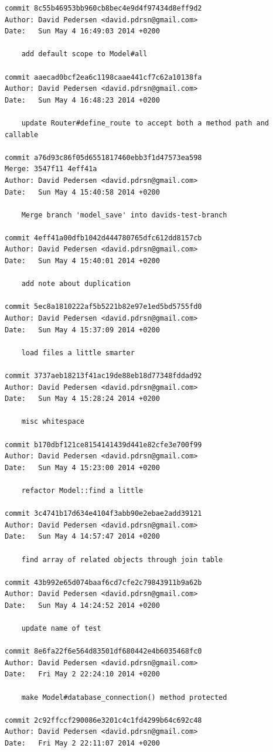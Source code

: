 \documentclass[12pt]{article}
\begin{document}
\begin{verbatim}
commit 8c55b46953bb960cb8bec4e9d4f97434d8eff9d2
Author: David Pedersen <david.pdrsn@gmail.com>
Date:   Sun May 4 16:49:03 2014 +0200

    add default scope to Model#all

commit aaecad0bcf2ea6c1198caae441cf7c62a10138fa
Author: David Pedersen <david.pdrsn@gmail.com>
Date:   Sun May 4 16:48:23 2014 +0200

    update Router#define_route to accept both a method path and callable

commit a76d93c86f05d6551817460ebb3f1d47573ea598
Merge: 3547f11 4eff41a
Author: David Pedersen <david.pdrsn@gmail.com>
Date:   Sun May 4 15:40:58 2014 +0200

    Merge branch 'model_save' into davids-test-branch

commit 4eff41a00dfb1042d444780765dfc612dd8157cb
Author: David Pedersen <david.pdrsn@gmail.com>
Date:   Sun May 4 15:40:01 2014 +0200

    add note about duplication

commit 5ec8a1810222af5b5221b82e97e1ed5bd5755fd0
Author: David Pedersen <david.pdrsn@gmail.com>
Date:   Sun May 4 15:37:09 2014 +0200

    load files a little smarter

commit 3737aeb18213f41ac19de88eb18d77348fddad92
Author: David Pedersen <david.pdrsn@gmail.com>
Date:   Sun May 4 15:28:24 2014 +0200

    misc whitespace

commit b170dbf121ce8154141439d441e82cfe3e700f99
Author: David Pedersen <david.pdrsn@gmail.com>
Date:   Sun May 4 15:23:00 2014 +0200

    refactor Model::find a little

commit 3c4741b17d634e4104f3abb90e2ebae2add39121
Author: David Pedersen <david.pdrsn@gmail.com>
Date:   Sun May 4 14:57:47 2014 +0200

    find array of related objects through join table

commit 43b992e65d074baaf6cd7cfe2c79843911b9a62b
Author: David Pedersen <david.pdrsn@gmail.com>
Date:   Sun May 4 14:24:52 2014 +0200

    update name of test

commit 8e6fa22f6e564d83501df680442e4b6035468fc0
Author: David Pedersen <david.pdrsn@gmail.com>
Date:   Fri May 2 22:24:10 2014 +0200

    make Model#database_connection() method protected

commit 2c92ffccf290086e3201c4c1fd4299b64c692c48
Author: David Pedersen <david.pdrsn@gmail.com>
Date:   Fri May 2 22:11:07 2014 +0200


\end{verbatim}
\end{document}
